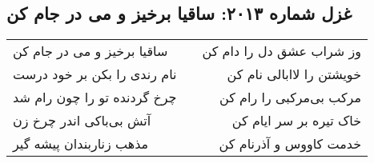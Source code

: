 \begin{center}
\section*{غزل شماره ۲۰۱۳: ساقیا برخیز و می در جام کن}
\label{sec:2013}
\begin{longtable}{l p{0.5cm} r}
ساقیا برخیز و می در جام کن
&&
وز شراب عشق دل را دام کن
\\
نام رندی را بکن بر خود درست
&&
خویشتن را لاابالی نام کن
\\
چرخ گردنده تو را چون رام شد
&&
مرکب بی‌مرکبی را رام کن
\\
آتش بی‌باکی اندر چرخ زن
&&
خاک تیره بر سر ایام کن
\\
مذهب زناربندان پیشه گیر
&&
خدمت کاووس و آذرنام کن
\\
\end{longtable}
\end{center}
